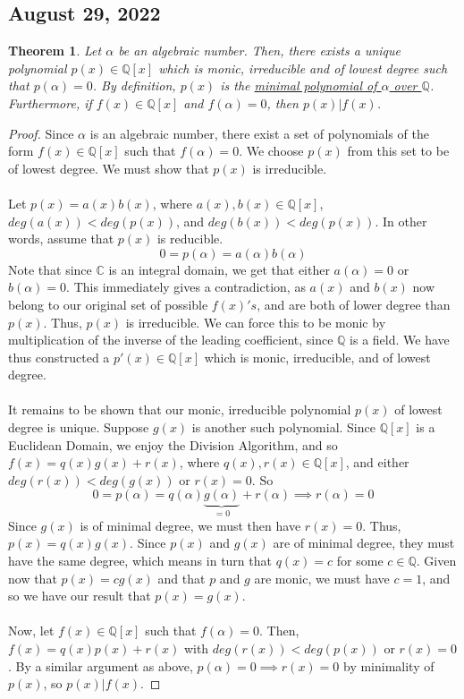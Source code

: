 \documentclass{article}
\newcommand{\C}{\mathbb{C}}
\newcommand{\Q}{\mathbb{Q}}
\newtheorem{theorem}{Theorem}
\begin{document}
\subsection{August 29, 2022}
\begin{theorem}
Let $\alpha$ be an algebraic number. Then, there exists a unique polynomial $p(x)\in\Q[x]$ which is monic, irreducible and of lowest degree such that $p(\alpha)=0$. By definition, $p(x)$ is the \underline{minimal polynomial of $\alpha$ over $\Q$}. Furthermore, if $f(x)\in\Q[x]$ and $f(\alpha)=0$, then $p(x)|f(x)$.
\end{theorem}
\begin{proof}
Since $\alpha$ is an algebraic number, there exist a set of polynomials of the form $f(x)\in\Q[x]$ such that $f(\alpha)=0$. We choose $p(x)$ from this set to be of lowest degree. We must show that $p(x)$ is irreducible.\\
\\
Let $p(x)=a(x)b(x)$, where $a(x),b(x)\in\Q[x]$, $deg(a(x))<deg(p(x))$, and $deg(b(x))<deg(p(x))$. In other words, assume that $p(x)$ is reducible.
$$0=p(\alpha)=a(\alpha)b(\alpha)$$
Note that since $\C$ is an integral domain, we get that either $a(\alpha)=0$ or $b(\alpha)=0$. This immediately gives a contradiction, as $a(x)$ and $b(x)$ now belong to our original set of possible $f(x)'s$, and are both of lower degree than $p(x)$. Thus, $p(x)$ is irreducible. We can force this to be monic by multiplication of the inverse of the leading coefficient, since $\Q$ is a field. We have thus constructed a $p'(x)\in\Q[x]$ which is monic, irreducible, and of lowest degree. \\
\\
It remains to be shown that our monic, irreducible polynomial $p(x)$ of lowest degree is unique. Suppose $g(x)$ is another such polynomial. Since $\Q[x]$ is a Euclidean Domain, we enjoy the Division Algorithm, and so $f(x)=q(x)g(x)+r(x)$, where $q(x),r(x)\in\Q[x]$, and either $deg(r(x))<deg(g(x))$ or $r(x)=0$.
So 
$$0=p(\alpha)=q(\alpha)\underbrace{g(\alpha)}_{=0}+r(\alpha)\implies r(\alpha)=0$$
Since $g(x)$ is of minimal degree, we must then have $r(x)=0$. Thus, $p(x)=q(x)g(x)$. Since $p(x)$ and $g(x)$ are of minimal degree, they must have the same degree, which means in turn that $q(x)=c$ for some $c\in\Q$. Given now that $p(x)=cg(x)$ and that $p$ and $g$ are monic, we must have $c=1$, and so we have our result that $p(x)=g(x)$.\\
\\
Now, let $f(x)\in\Q[x]$ such that $f(\alpha)=0$. Then, $f(x)=q(x)p(x)+r(x)$ with $deg(r(x))<deg(p(x))$ or $r(x)=0$. By a similar argument as above, $p(\alpha)=0\implies r(x)=0$ by minimality of $p(x)$, so $p(x)|f(x)$.
\end{proof}
\end{document}

